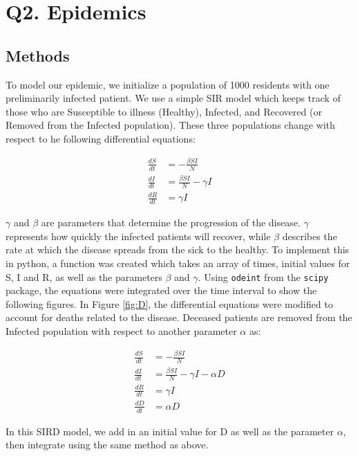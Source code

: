 \documentclass{article}
\begin{document}
\pagebreak

\section{Q2. Epidemics}

\subsection{Methods}

To model our epidemic, we initialize a population of 1000 residents with one preliminarily infected patient. We use a simple SIR model which keeps track of those who are Susceptible to illness (Healthy), Infected, and Recovered (or Removed from the Infected population). These three populations change with respect to he following differential equations:

\begin{align}
    \frac{dS}{dt} &= -\frac{\beta S I}{N} \\
    \frac{dI}{dt} &= \frac{\beta S I}{N} - \gamma I \\
    \frac{dR}{dt} &= \gamma I
\end{align}

$\gamma$ and $\beta$ are parameters that determine the progression of the disease. $\gamma$ represents how quickly the infected patients will recover, while $\beta$ describes the rate at which the disease spreads from the sick to the healthy. To implement this in python, a function was created which takes an array of times, initial values for S, I and R, as well as the parameters $\beta$ and $\gamma$. Using {\tt odeint} from the {\tt scipy} package, the equations were integrated over the time interval to show the following figures. In Figure \ref{fig:D}, the differential equations were modified to account for deaths related to the disease. Deceased patients are removed from the Infected population with respect to another parameter $\alpha$ as:

\begin{align}
    \frac{dS}{dt} &= -\frac{\beta S I}{N} \\
    \frac{dI}{dt} &= \frac{\beta S I}{N} - \gamma I  - \alpha D \\
    \frac{dR}{dt} &= \gamma I \\
    \frac{dD}{dt} &= \alpha D
\end{align}

In this SIRD model, we add in an initial value for D as well as the parameter $\alpha$, then integrate using the same method as above.
\end{document}
